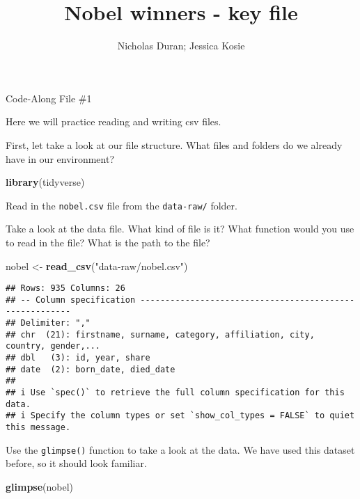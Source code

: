 \documentclass[
]{article}
\title{Nobel winners - key file}
\author{Nicholas Duran; Jessica Kosie}
\date{}
\newenvironment{Shaded}{\begin{snugshade}}{\end{snugshade}}
\newcommand{\FunctionTok}[1]{\textcolor[rgb]{0.13,0.29,0.53}{\textbf{#1}}}
\newcommand{\NormalTok}[1]{#1}
\newcommand{\OtherTok}[1]{\textcolor[rgb]{0.56,0.35,0.01}{#1}}
\newcommand{\StringTok}[1]{\textcolor[rgb]{0.31,0.60,0.02}{#1}}
\begin{document}
\maketitle

Code-Along File \#1

Here we will practice reading and writing csv files.

First, let take a look at our file structure. What files and folders do
we already have in our environment?

\begin{Shaded}
\begin{Highlighting}[]
\FunctionTok{library}\NormalTok{(tidyverse)}
\end{Highlighting}
\end{Shaded}

Read in the \texttt{nobel.csv} file from the \texttt{data-raw/} folder.

Take a look at the data file. What kind of file is it? What function
would you use to read in the file? What is the path to the file?

\begin{Shaded}
\begin{Highlighting}[]
\NormalTok{nobel }\OtherTok{\textless{}{-}} \FunctionTok{read\_csv}\NormalTok{(}\StringTok{"data{-}raw/nobel.csv"}\NormalTok{)}
\end{Highlighting}
\end{Shaded}

\begin{verbatim}
## Rows: 935 Columns: 26
## -- Column specification --------------------------------------------------------
## Delimiter: ","
## chr  (21): firstname, surname, category, affiliation, city, country, gender,...
## dbl   (3): id, year, share
## date  (2): born_date, died_date
## 
## i Use `spec()` to retrieve the full column specification for this data.
## i Specify the column types or set `show_col_types = FALSE` to quiet this message.
\end{verbatim}

Use the \texttt{glimpse()} function to take a look at the data. We have
used this dataset before, so it should look familiar.

\begin{Shaded}
\begin{Highlighting}[]
\FunctionTok{glimpse}\NormalTok{(nobel)}
\end{Highlighting}
\end{Shaded}
\end{document}
